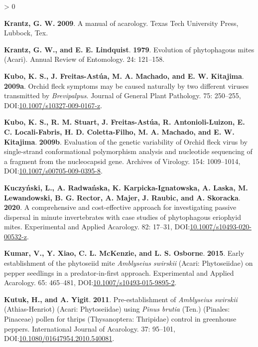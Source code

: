 \documentclass{ufdissertation}[overrideChapters] %
\newlength{\cslhangindent}
\newenvironment{CSLReferences}[2] %
 {%
  \setlength{\parindent}{0pt}
  \ifodd #1 \everypar{\setlength{\hangindent}{\cslhangindent}}\ignorespaces\fi
  \ifnum #2 > 0
  \setlength{\parskip}{#2\baselineskip}
  \fi
 }%
 {}
\begin{document}
{\begin{CSLReferences}{1}{1}
\leavevmode{}%
\textbf{Krantz, G. W.} \textbf{2009}. A manual of acarology. Texas Tech University Press, Lubbock, Tex.

\leavevmode{}%
\textbf{Krantz, G. W., and E. E. Lindquist}. \textbf{1979}. Evolution of phytophagous mites ({Acari}). Annual Review of Entomology. 24: 121--158.

\leavevmode{}%
\textbf{Kubo, K. S., J. Freitas-Astúa, M. A. Machado, and E. W. Kitajima}. \textbf{2009a}. {Orchid fleck} symptoms may be caused naturally by two different viruses transmitted by {\emph{Brevipalpus}}. Journal of General Plant Pathology. 75: 250--255, DOI:\href{https://doi.org/10.1007/s10327-009-0167-z}{10.1007/s10327-009-0167-z}.

\leavevmode{}%
\textbf{Kubo, K. S., R. M. Stuart, J. Freitas-Astúa, R. Antonioli-Luizon, E. C. Locali-Fabris, H. D. Coletta-Filho, M. A. Machado, and E. W. Kitajima}. \textbf{2009b}. Evaluation of the genetic variability of {Orchid fleck virus} by single-strand conformational polymorphism analysis and nucleotide sequencing of a fragment from the nucleocapsid gene. Archives of Virology. 154: 1009--1014, DOI:\href{https://doi.org/10.1007/s00705-009-0395-8}{10.1007/s00705-009-0395-8}.

\leavevmode{}%
\textbf{Kuczyński, L., A. Radwańska, K. Karpicka-Ignatowska, A. Laska, M. Lewandowski, B. G. Rector, A. Majer, J. Raubic, and A. Skoracka}. \textbf{2020}. A comprehensive and cost-effective approach for investigating passive dispersal in minute invertebrates with case studies of phytophagous eriophyid mites. Experimental and Applied Acarology. 82: 17--31, DOI:\href{https://doi.org/10.1007/s10493-020-00532-z}{10.1007/s10493-020-00532-z}.

\leavevmode{}%
\textbf{Kumar, V., Y. Xiao, C. L. McKenzie, and L. S. Osborne}. \textbf{2015}. Early establishment of the phytoseiid mite {\emph{Amblyseius swirskii}} ({Acari}: {Phytoseiidae}) on pepper seedlings in a predator-in-first approach. Experimental and Applied Acarology. 65: 465--481, DOI:\href{https://doi.org/10.1007/s10493-015-9895-2}{10.1007/s10493-015-9895-2}.

\leavevmode{}%
\textbf{Kutuk, H., and A. Yigit}. \textbf{2011}. Pre-establishment of {\emph{Amblyseius swirskii}} {(Athias-Henriot)} {({Acari}: {Phytoseiidae})} using {\emph{Pinus brutia}} {(Ten.)} {(Pinales: Pinaceae)} pollen for thrips {(Thysanoptera: Thripidae)} control in greenhouse peppers. International Journal of Acarology. 37: 95--101, DOI:\href{https://doi.org/10.1080/01647954.2010.540081}{10.1080/01647954.2010.540081}.


\end{CSLReferences}}
\end{document}
